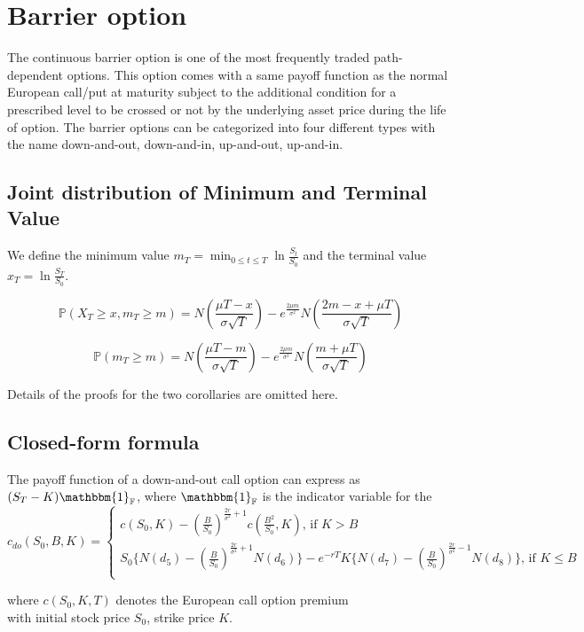 \section*{Barrier option}
The continuous barrier option is one of the most frequently traded path-dependent options. This option comes with a same payoff function as the normal European call/put at maturity subject to the additional condition for a prescribed level to be crossed or not by the underlying asset price during the life of option. The barrier options can be categorized into four different types with the name down-and-out, down-and-in, up-and-out, up-and-in.
\subsection*{Joint distribution of Minimum and Terminal Value}
We define the minimum value $\displaystyle m_{T} = \min_{0 \le t \le T} \ln{\frac{S_{t}}{S_{0}}}$ and the terminal value $x_{T} = \ln{\frac{S_{T}}{S_{0}}}$.\\
\begin{corollary}
$$\mathbb{P}(X_{T} \ge x, m_{T} \ge m) = N(\frac{\mu T - x}{\sigma \sqrt{T}}) - e^{\frac{2\mu m}{\sigma^{2}}}N(\frac{2m-x+\mu T}{\sigma \sqrt{T}})$$
\end{corollary}
\begin{corollary}
$$\mathbb{P}(m_{T} \ge m) = N(\frac{\mu T - m}{\sigma \sqrt{T}}) - e^{\frac{2\mu m}{\sigma^{2}}}N(\frac{m+\mu T}{\sigma \sqrt{T}})$$
\end{corollary}
Details of the proofs for the two corollaries are omitted here.

\subsection*{Closed-form formula}
The payoff function of a down-and-out call option can express as $(S_{T} - K)\mathbbm{1}_{\mathbb{F}}$, where $\mathbbm{1}_{\mathbb{F}}$ is the indicator variable for the 
\begin{equation*}
c_{do}(S_{0}, B, K) = 
\begin{cases}
c(S_{0}, K) - {(\frac{B}{S_{0}})}^{\frac{2r}{\sigma^{2}}+1} c(\frac{B^{2}}{S_{0}}, K) \text{, if }K > B\\
S_{0}\{ N(d_{5}) - {(\frac{B}{S_{0}})}^{\frac{2r}{\sigma^{2}}+1} N(d_{6})\} - e^{-rT}K\{ N(d_{7}) - {(\frac{B}{S_{0}})}^{\frac{2r}{\sigma^{2}}-1} N(d_{8})\} \text{, if }K \le B\\
\end{cases}
\end{equation*}
\begin{center}
where $c(S_{0}, K, T)$ denotes the European call option premium\\ with initial stock price $S_{0}$, strike price $K$.
\end{center}
